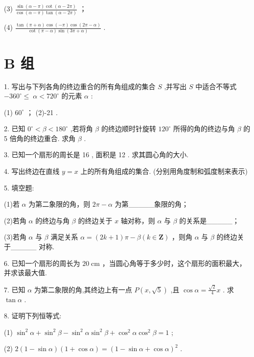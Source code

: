 \documentclass[10pt]{article}
\begin{document}
(3) \(\frac{\sin \left( {\alpha  - \pi }\right) \cot \left( {\alpha  - {2\pi }}\right) }{\cos \left( {\alpha  - \pi }\right) \tan \left( {\alpha  - {2\pi }}\right) }\) ；

(4) \(\frac{\tan \left( {\pi  + \alpha }\right) \cos \left( {-\pi }\right) \cos \left( {{2\pi } - \alpha }\right) }{\cot \left( {\pi  - \alpha }\right) \sin \left( {{3\pi } + \alpha }\right) }\) .

\section*{B 组}

1. 写出与下列各角的终边重合的所有角组成的集合 \(S\) ,并写出 \(S\) 中适合不等式 \(- {360}^{ \circ  } \leq \; \alpha  < {720}^{ \circ  }\) 的元素 \(\alpha\) :

(1) \({60}^{ \circ  }\) ； (2)-21 \textdegree .

2. 已知 \({0}^{ \circ  } < \beta  < {180}^{ \circ  }\) ,若将角 \(\beta\) 的终边顺时针旋转 \({120}^{ \circ  }\) 所得的角的终边与角 \(\beta\) 的 5 倍角的终边重合. 求角 \(\beta\) .

3. 已知一个扇形的周长是 16 , 面积是 12 . 求其圆心角的大小.

4. 写出终边在直线 \(y = x\) 上的所有角组成的集合. (分别用角度制和弧度制来表示)

5. 填空题:

(1)若 \(\alpha\) 为第二象限的角，则 \({2\pi } - \alpha\) 为第\_\_\_\_\_象限的角；

(2)若角 \(\alpha\) 的终边与角 \(\beta\) 的终边关于 \(x\) 轴对称，则 \(\alpha\) 与 \(\beta\) 的关系是\_\_\_\_\_；

(3)若角 \(\alpha\) 与 \(\beta\) 满足关系 \(\alpha  = \left( {{2k} + 1}\right) \pi  - \beta \left( {k \in  \mathbf{Z}}\right)\) ，则角 \(\alpha\) 与 \(\beta\) 的终边关于\_\_\_\_\_ 对称.

6. 已知一个扇形的周长为 \({20}\mathrm{\;{cm}}\) ，当圆心角等于多少时，这个扇形的面积最大，并求该最大值.

7. 已知 \(\alpha\) 为第二象限的角,其终边上有一点 \(P\left( {x,\sqrt{5}}\right)\) ,且 \(\cos \alpha  = \frac{\sqrt{2}}{4}x\) . 求 \(\tan \alpha\) .

8. 证明下列恒等式:

(1) \({\sin }^{2}\alpha  + {\sin }^{2}\beta  - {\sin }^{2}\alpha {\sin }^{2}\beta  + {\cos }^{2}\alpha {\cos }^{2}\beta  = 1\) ;

(2) \(2\left( {1 - \sin \alpha }\right) \left( {1 + \cos \alpha }\right)  = {\left( 1 - \sin \alpha  + \cos \alpha \right) }^{2}\) .
\end{document}
